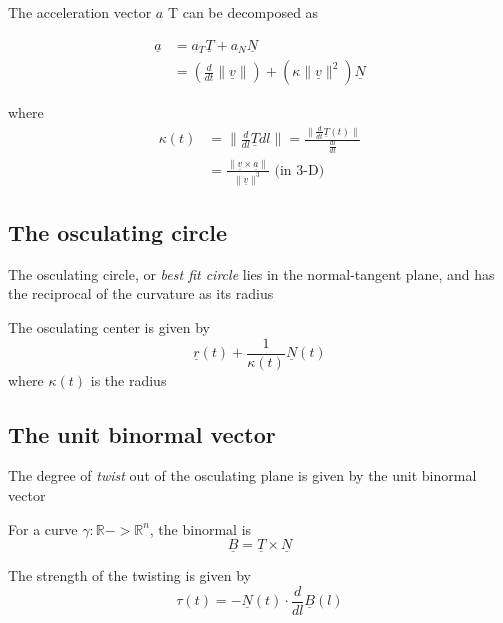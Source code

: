 The acceleration vector $a$ T can be decomposed as
\begin{framed}
   \begin{align*}
      \underline{a} &= a_T \underline{T} + a_N \underline{N} \\
                    &= \left( \frac{d}{dt} \lVert \underline{v} \rVert \right) + \left( \kappa \lVert \underline{v} \rVert^2 \right) \underline{N} 
   \end{align*}

   where \begin{align*}
      \kappa(t) &= \lVert \frac{d}{dl} \underline{T}dl \rVert = \frac{ \lVert \frac{d}{dt} \underline{T}(t) \rVert }{ \frac{dl}{dt}}
 \\
                &= \frac{ \lVert \underline{v} \times \underline{a} \rVert }{ \lVert \underline{v} \rVert^3} \text{ (in 3-D)}
   \end{align*}
\end{framed}

\subsection{The osculating circle}

The osculating circle, or \emph{best fit circle} lies in the normal-tangent plane, and has the reciprocal of the curvature as its radius

\begin{framed}
  The osculating center is given by \[
    \underline{r}(t) + \frac{1}{\kappa(t)} \underline{N}(t)
  \] where $\kappa (t)$ is the radius
\end{framed}

\subsection{The unit binormal vector}

The degree of \emph{twist} out of the osculating plane is given by the unit binormal vector
\begin{framed}
   For a curve $\gamma : \mathbb{R} -> \mathbb{R}^n$, the binormal is
   \[
     \underline{B} = \underline{T} \times \underline{N}
   \] 

   The strength of the twisting is given by \[
      \tau(t)= - \underline{N}(t) \cdot \frac{d}{dl} \underline{B}(l)
   \] 
\end{framed}







